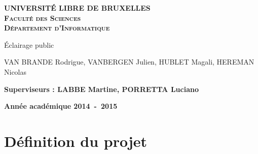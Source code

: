 \documentclass[a4paper,10pt]{report}
\begin{document}
\begin{titlepage}
\begin{center}
\textbf{\textsc{UNIVERSIT\'E LIBRE DE BRUXELLES}}\\
\textbf{\textsc{Facult\'e des Sciences}}\\
\textbf{\textsc{D\'epartement d'Informatique}}
\vfill{}\vfill{}
\begin{center}{\Huge \'Eclairage public}\end{center}{\Huge \par}
\begin{center}{\large VAN BRANDE Rodrigue, VANBERGEN Julien, HUBLET Magali, HEREMAN Nicolas}\end{center}{\Huge \par}
\vfill{}\vfill{}
\begin{flushleft}{\large \textbf{Superviseurs : LABBE Martine, PORRETTA Luciano}}\hfill{}\end{flushleft}{\large\par}
\vfill{}\vfill{}\enlargethispage{3cm}
\textbf{Ann\'ee acad\'emique 2014~-~2015}
\end{center}
\end{titlepage}



\tableofcontents


\chapter{D\'efinition du projet}





\end{document}
